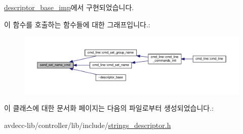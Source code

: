 \hyperlink{classavdecc__lib_1_1descriptor__base__imp_af0bb05af3bf67f2ab0eb522096011592}{descriptor\+\_\+base\+\_\+imp}에서 구현되었습니다.



이 함수를 호출하는 함수들에 대한 그래프입니다.\+:
\nopagebreak
\begin{figure}[H]
\begin{center}
\leavevmode
\includegraphics[width=350pt]{classavdecc__lib_1_1descriptor__base_a6a8c227d7a202f251c689107df7ede0b_icgraph}
\end{center}
\end{figure}




이 클래스에 대한 문서화 페이지는 다음의 파일로부터 생성되었습니다.\+:\begin{DoxyCompactItemize}
\item 
avdecc-\/lib/controller/lib/include/\hyperlink{strings__descriptor_8h}{strings\+\_\+descriptor.\+h}\end{DoxyCompactItemize}
